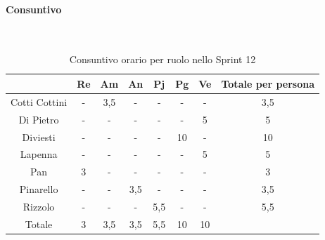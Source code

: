 \documentclass{article}
\begin{document}
                \paragraph{Consuntivo}\mbox{}\\
                \begin{table}[H]
                    \centering
                    \begin{tabular}{|c|c|c|c|c|c|c|c|}
                    \hline
                                  & Re  & Am  & An  & Pj  & Pg  & Ve  & Totale per persona \\ \hline
                    Cotti Cottini & -   & 3,5 & -   & -   & -   & -   & 3,5                \\ \hline
                    Di Pietro     & -   & -   & -   & -   & -   & 5   & 5                  \\ \hline
                    Diviesti      & -   & -   & -   & -   & 10  & -   & 10                 \\ \hline
                    Lapenna       & -   & -   & -   & -   & -   & 5   & 5                  \\ \hline
                    Pan           & 3   & -   & -   & -   & -   & -   & 3                  \\ \hline
                    Pinarello     & -   & -   & 3,5 & -   & -   & -   & 3,5                \\ \hline
                    Rizzolo       & -   & -   & -   & 5,5 & -   & -   & 5,5                \\ \hline
                    Totale        & 3   & 3,5 & 3,5 & 5,5 & 10  & 10  &                    \\ \hline
                    \end{tabular}
                    \caption{Consuntivo orario per ruolo nello Sprint 12}
                \end{table}

\end{document}
